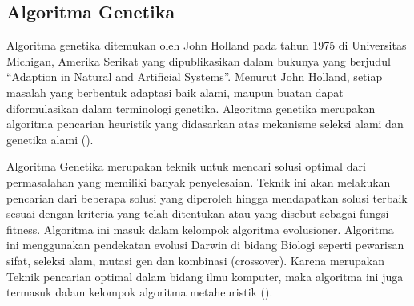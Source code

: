\subsection{Algoritma Genetika}
\label{subsec:Algoritma}
Algoritma genetika ditemukan oleh John Holland pada tahun 1975 di Universitas Michigan, Amerika Serikat yang dipublikasikan dalam bukunya yang berjudul “Adaption in Natural and Artificial Systems”. 
Menurut John Holland, setiap masalah yang berbentuk adaptasi baik alami, maupun buatan dapat diformulasikan dalam terminologi genetika. Algoritma genetika merupakan algoritma pencarian heuristik yang didasarkan atas mekanisme seleksi alami dan genetika alami (\cite{Mauluddin2018}). 

Algoritma Genetika merupakan teknik untuk mencari solusi optimal dari permasalahan yang memiliki banyak penyelesaian. 
Teknik ini akan melakukan pencarian dari beberapa solusi yang diperoleh hingga mendapatkan solusi terbaik sesuai dengan kriteria yang telah ditentukan atau yang disebut sebagai fungsi fitness. 
Algoritma ini masuk dalam kelompok algoritma evolusioner. Algoritma ini menggunakan pendekatan evolusi Darwin di bidang Biologi seperti pewarisan sifat, seleksi alam, mutasi gen dan kombinasi (crossover).  
Karena merupakan Teknik pencarian optimal dalam bidang ilmu komputer, maka algoritma ini juga termasuk dalam kelompok algoritma metaheuristik (\cite{binusAlgoritmaGenetika}).

